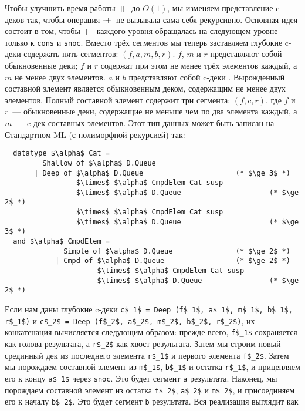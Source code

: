 Чтобы улучшить время работы $+\!\!\!+\,$ до $O(1)$, мы изменяем
представление c-деков так, чтобы операция $+\!\!\!+\,$ не вызывала сама
себя рекурсивно. Основная идея состоит в том, чтобы $+\!\!\!+\,$ каждого уровня
обращалась на следующем уровне только к \lstinline!cons! и
\lstinline!snoc!. Вместо трёх сегментов мы теперь заставляем глубокие
c-деки содержать пять сегментов: $(f, a, m, b, r)$. $f$, $m$ и $r$
представляют собой обыкновенные деки; $f$ и $r$ содержат при этом не
менее трёх элементов каждый, а $m$ не менее двух элементов. $a$ и $b$
представляют собой c-деки . Вырожденный составной элемент является обыкновенным деком,
содержащим не менее двух элементов.  Полный составной элемент содержит
три сегмента: $(f, c, r)$, где $f$ и $r$~--- обыкновенные деки,
содержащие не меньше чем по два элемента каждый, а $m$~--- c-дек
составных элементов. Этот тип данных может быть записан на Стандартном
ML (с полиморфной рекурсией) так:
\begin{lstlisting}
  datatype $\alpha$ Cat =
         Shallow of $\alpha$ D.Queue
       | Deep of $\alpha$ D.Queue                      (* $\ge 3$ *)
                 $\times$ $\alpha$ CmpdElem Cat susp
                 $\times$ $\alpha$ D.Queue                     (* $\ge 2$ *)
                 $\times$ $\alpha$ CmpdElem Cat susp
                 $\times$ $\alpha$ D.Queue                     (* $\ge 3$ *)
  and $\alpha$ CmpdElem = 
              Simple of $\alpha$ D.Queue               (* $\ge 2$ *)
            | Cmpd of $\alpha$ D.Queue                 (* $\ge 2$ *)
                      $\times$ $\alpha$ CmpdElem Cat susp
                      $\times$ $\alpha$ D.Queue                (* $\ge 2$ *)
\end{lstlisting}
Если нам даны глубокие c-деки 
\lstinline!c$_1$ = Deep (f$_1$, a$_1$, m$_1$, b$_1$, r$_1$)! и 
\lstinline!c$_2$ = Deep (f$_2$, a$_2$, m$_2$, b$_2$, r$_2$)!, их
конкатенация вычисляется следующим образом: прежде всего,
\lstinline!f$_1$! сохраняется как голова результата, а
\lstinline!r$_2$! как хвост результата. Затем мы строим новый
срединный дек из последнего элемента \lstinline!r$_1$! и первого
элемента \lstinline!f$_2$!.  Затем мы порождаем составной элемент из
\lstinline!m$_1$!, \lstinline!b$_1$! и остатка \lstinline!r$_1$!, и
прицепляем его к концу \lstinline!a$_1$! через \lstinline!snoc!. Это
будет сегмент \lstinline!a! результата. Наконец, мы порождаем
составной элемент из остатка \lstinline!f$_2$!, \lstinline!a$_2$! и
\lstinline!m$_2$!, и присоединяем его к началу \lstinline!b$_2$!. Это
будет сегмент \lstinline!b! результата. Вся реализация выглядит как
